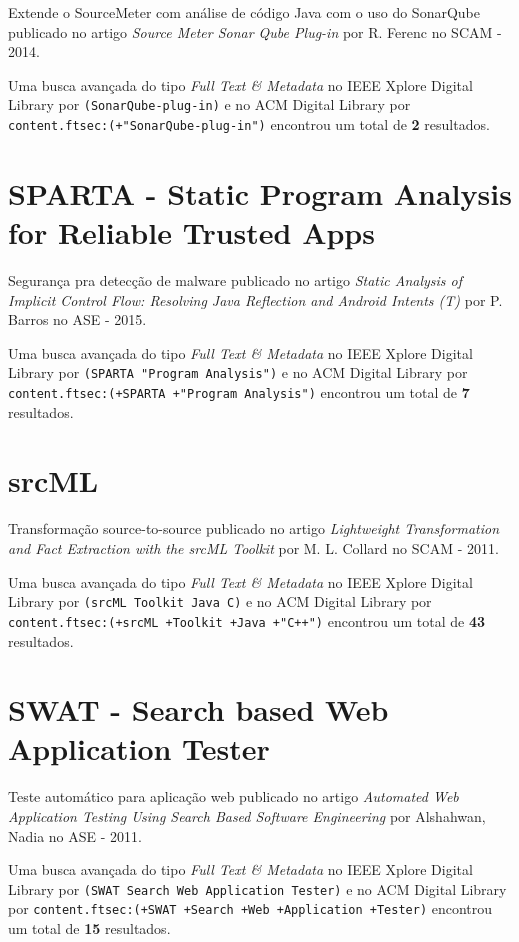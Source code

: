 Extende o SourceMeter com análise de código Java com o uso do SonarQube
publicado no artigo
{\it Source Meter Sonar Qube Plug-in}
por
R. Ferenc
no
SCAM
-
2014.


Uma busca avançada do tipo {\it Full Text \& Metadata} no IEEE Xplore Digital Library por
\texttt{(SonarQube-plug-in)}
e no ACM Digital Library por
\texttt{content.ftsec:(+"SonarQube-plug-in")}
encontrou um total de
{\bf 2}
resultados.

\section{SPARTA - Static Program Analysis for Reliable Trusted Apps}

Segurança pra detecção de malware
publicado no artigo
{\it Static Analysis of Implicit Control Flow: Resolving Java Reflection and Android Intents (T)}
por
P. Barros
no
ASE
-
2015.


Uma busca avançada do tipo {\it Full Text \& Metadata} no IEEE Xplore Digital Library por
\texttt{(SPARTA "Program Analysis")}
e no ACM Digital Library por
\texttt{content.ftsec:(+SPARTA +"Program Analysis")}
encontrou um total de
{\bf 7}
resultados.

\section{srcML}

Transformação source-to-source
publicado no artigo
{\it Lightweight Transformation and Fact Extraction with the srcML Toolkit}
por
M. L. Collard
no
SCAM
-
2011.


Uma busca avançada do tipo {\it Full Text \& Metadata} no IEEE Xplore Digital Library por
\texttt{(srcML Toolkit Java C)}
e no ACM Digital Library por
\texttt{content.ftsec:(+srcML +Toolkit +Java +"C++")}
encontrou um total de
{\bf 43}
resultados.

\section{SWAT - Search based Web Application Tester}

Teste automático para aplicação web
publicado no artigo
{\it Automated Web Application Testing Using Search Based Software Engineering}
por
Alshahwan, Nadia
no
ASE
-
2011.


Uma busca avançada do tipo {\it Full Text \& Metadata} no IEEE Xplore Digital Library por
\texttt{(SWAT Search Web Application Tester)}
e no ACM Digital Library por
\texttt{content.ftsec:(+SWAT +Search +Web +Application +Tester)}
encontrou um total de
{\bf 15}
resultados.

